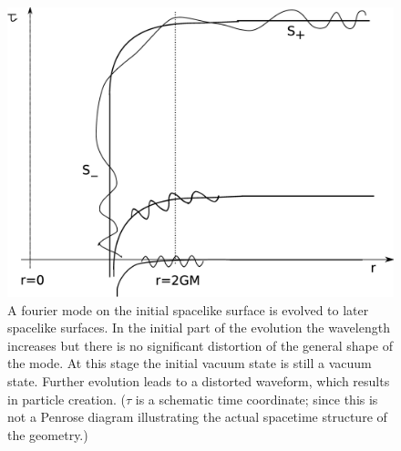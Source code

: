 \documentclass[12pt]{article}
\begin{document}
\begin{figure}[ht]
\includegraphics[scale=.20]{matffourt.eps}
%
%
\caption{A fourier mode on the initial spacelike surface is evolved  to later spacelike surfaces. In the initial part of the evolution the wavelength increases but there is no significant distortion of the general shape of the mode. At this stage the initial vacuum state is still a vacuum state. Further evolution leads to a distorted waveform, which results in particle creation. ($\tau$ is a schematic time coordinate; since this is not a Penrose diagram illustrating the actual spacetime structure of the geometry.)}
\label{matffourt}       %
\end{figure}
\end{document}
